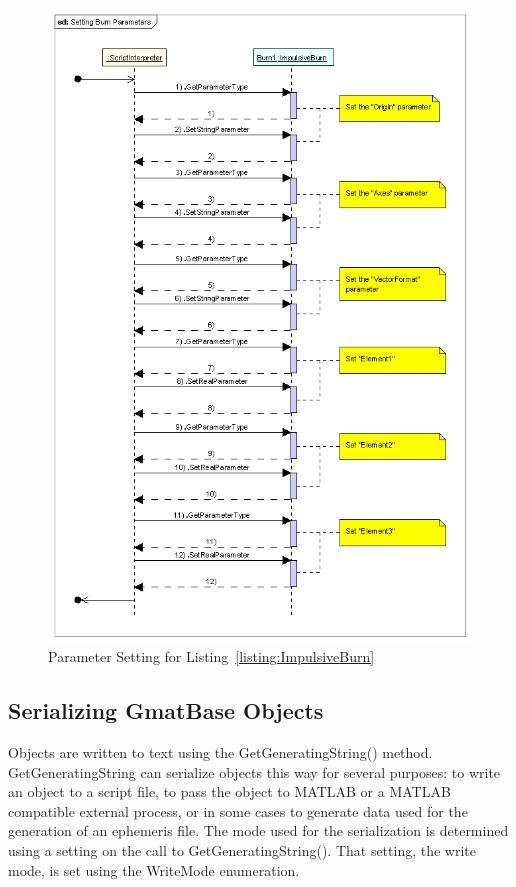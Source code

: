 \begin{figure}[htb]
\begin{center}
\includegraphics[241,416]{Images/SettingBurnParameters.png}
\caption{\label{figure:SettingBurnParameters}Parameter Setting for
Listing~\ref{listing:ImpulsiveBurn}}
\end{center}
\end{figure}

\subsection{Serializing GmatBase Objects}

Objects are written to text using the GetGeneratingString() method.  GetGeneratingString can
serialize objects this way for several purposes: to write an object to a script file, to pass the
object to MATLAB or a MATLAB compatible external process, or in some cases to generate data used
for the generation of an ephemeris file.  The mode used for the serialization is determined using a
setting on the call to GetGeneratingString().  That setting, the write mode, is set using the
WriteMode enumeration.

